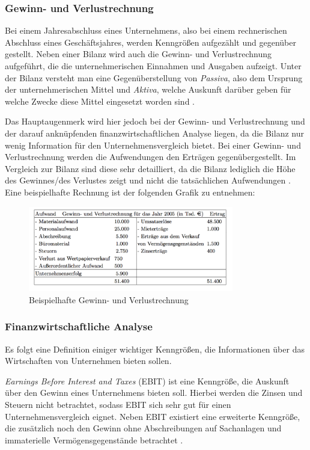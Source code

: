 \subsubsection{Gewinn- und Verlustrechnung}

Bei einem Jahresabschluss eines Unternehmens, also bei einem rechnerischen Abschluss eines Geschäftsjahres, werden Kenngrößen aufgezählt und gegenüber gestellt. Neben einer Bilanz wird auch die Gewinn- und Verlustrechnung aufgeführt, die die unternehmerischen Einnahmen und Ausgaben aufzeigt. Unter der Bilanz versteht man eine Gegenüberstellung von \textit{Passiva}, also dem Ursprung der unternehmerischen Mittel und \textit{Aktiva}, welche Auskunft darüber geben für welche Zwecke diese Mittel eingesetzt worden sind \cite{muller}. 

Das Hauptaugenmerk wird hier jedoch bei der Gewinn- und Verlustrechnung und der darauf anknüpfenden finanzwirtschaftlichen Analyse liegen, da die Bilanz nur wenig Information für den Unternehmensvergleich bietet. Bei einer Gewinn- und Verlustrechnung werden die Aufwendungen den Erträgen gegenübergestellt. Im Vergleich zur Bilanz sind diese sehr detailliert, da die Bilanz lediglich die Höhe des Gewinnes/des Verlustes zeigt und nicht die tatsächlichen Aufwendungen \cite{muller}. Eine beispielhafte Rechnung ist der folgenden Grafik zu entnehmen:


\begin{figure}[H]
\centering
\includegraphics[width=0.8\textwidth]{pictures/guv.png}
\caption{Beispielhafte Gewinn- und Verlustrechnung \cite{muller}}
\label{fig:guv}
\end{figure}

\subsubsection{Finanzwirtschaftliche Analyse}

Es folgt eine Definition einiger wichtiger Kenngrößen, die Informationen über das Wirtschaften von Unternehmen bieten sollen. 

\textit{Earnings Before Interest and Taxes} (EBIT) ist eine Kenngröße, die Auskunft über den Gewinn eines Unternehmens bieten soll. Hierbei werden die Zinsen und Steuern nicht betrachtet, sodass EBIT sich sehr gut für einen Unternehmensvergleich eignet. Neben EBIT existiert eine erweiterte Kenngröße, die zusätzlich noch den Gewinn ohne Abschreibungen auf Sachanlagen und immaterielle Vermögensgegenstände betrachtet \cite{bwlformeln}.

